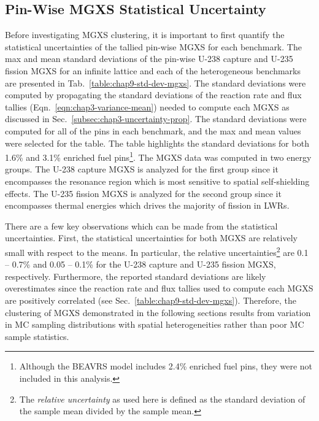 \subsection{Pin-Wise MGXS Statistical Uncertainty}
\label{subsec:chap9-mgxs-uncertainty}

Before investigating \ac{MGXS} clustering, it is important to first quantify the statistical uncertainties of the tallied pin-wise \ac{MGXS} for each benchmark. The max and mean standard deviations of the pin-wise U-238 capture and U-235 fission \ac{MGXS} for an infinite lattice and each of the heterogeneous benchmarks are presented in Tab.~\ref{table:chap9-std-dev-mgxs}. The standard deviations were computed by propagating the standard deviations of the reaction rate and flux tallies (Eqn.~\ref{eqn:chap3-variance-mean}) needed to compute each \ac{MGXS} as discussed in Sec.~\ref{subsec:chap3-uncertainty-prop}. The standard deviations were computed for all of the pins in each benchmark, and the max and mean values were selected for the table. The table highlights the standard deviations for both 1.6\% and 3.1\% enriched fuel pins\footnote{Although the \ac{BEAVRS} model includes 2.4\% enriched fuel pins, they were not included in this analysis.}. The \ac{MGXS} data was computed in two energy groups. The U-238 capture \ac{MGXS} is analyzed for the first group since it encompasses the resonance region which is most sensitive to spatial self-shielding effects. The U-235 fission \ac{MGXS} is analyzed for the second group since it encompasses thermal energies which drives the majority of fission in \acp{LWR}.

There are a few key observations which can be made from the statistical uncertainties. First, the statistical uncertainties for both \ac{MGXS} are relatively small with respect to the means. In particular, the relative uncertainties\footnote{The \textit{relative uncertainty} as used here is defined as the standard deviation of the sample mean divided by the sample mean.} are 0.1 -- 0.7\% and 0.05 -- 0.1\% for the U-238 capture and U-235 fission \ac{MGXS}, respectively. Furthermore, the reported standard deviations are likely overestimates since the reaction rate and flux tallies used to compute each \ac{MGXS} are positively correlated (see Sec.~\ref{table:chap9-std-dev-mgxs}). Therefore, the clustering of \ac{MGXS} demonstrated in the following sections results from variation in \ac{MC} sampling distributions with spatial heterogeneities rather than poor \ac{MC} sample statistics.

